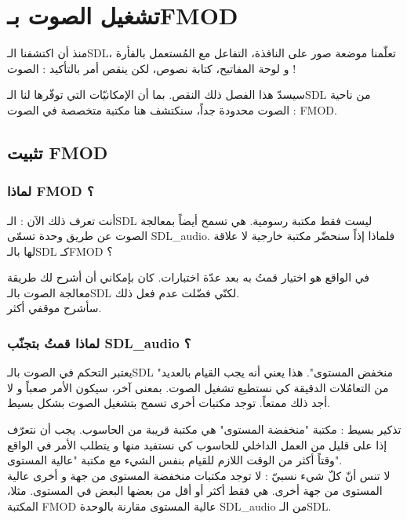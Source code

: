 \chapter{تشغيل الصوت بـ\textenglish{FMOD}}

منذ أن اكتشفنا الـ\textenglish{SDL}،
تعلّمنا موضعة صور على النافذة، التفاعل مع المُستعمل بالفأرة و لوحة المفاتيح، كتابة نصوص، لكن ينقص أمر بالتأكيد : الصوت !

سيسدّ هذا الفصل ذلك النقص. بما أن الإمكانيّات التي توفّرها لنا الـ\textenglish{SDL}
من ناحية الصوت محدودة جداً، سنكتشف هنا مكتبة متخصصة في الصوت :
\textenglish{FMOD}.

\section{تثبيت \textenglish{FMOD}}

\subsection{لماذا \textenglish{FMOD} ؟}

أنت تعرف ذلك الآن : الـ\textenglish{SDL}
ليست فقط مكتبة رسومية. هي تسمح أيضاً بمعالجة الصوت عن طريق وحدة تسمّى
\textenglish{SDL\_audio}.
فلماذا إذاً سنحضّر مكتبة خارجية لا علاقة لها بالـ\textenglish{SDL}
كـ\textenglish{FMOD} ؟

في الواقع هو اختيار قمتُ به بعد عدّة اختبارات. كان بإمكاني أن أشرح لك طريقة معالجة الصوت بالـ\textenglish{SDL}
لكنّي فضّلت عدم فعل ذلك.\\
سأشرح موقفي أكثر.

\subsection{لماذا قمتُ بتجنّب \textenglish{SDL\_audio} ؟}

يعتبر التحكم في الصوت بالـ\textenglish{SDL}
"منخفض المستوى". هذا يعني أنه يجب القيام بالعديد من التعامُلات الدقيقة كي نستطيع تشغيل الصوت. بمعنى آخر، سيكون الأمر صعباً و لا أجد ذلك ممتعاً. توجد مكتبات أخرى تسمح بتشغيل الصوت بشكل بسيط.

\begin{information}
تذكير بسيط : مكتبة "منخفضة المستوى" هي مكتبة قريبة من الحاسوب. يجب أن نتعرّف إذا على قليل من العمل الداخلي للحاسوب كي نستفيد منها و يتطلب الأمر في الواقع وقتاً أكثر من الوقت اللازم للقيام بنفس الشيء مع مكتبة "عالية المستوى".\\
لا تنس أنّ كلّ شيء نسبيّ : لا توجد مكتبات منخفضة المستوى من جهة و أخرى عالية المستوى من جهة أخرى. هي فقط أكثر أو أقل من بعضها البعض في المستوى. مثلا، المكتبة
\textenglish{FMOD}
عالية المستوى مقارنة بالوحدة
\textenglish{SDL\_audio}
من الـ\textenglish{SDL}.
\end{information}

